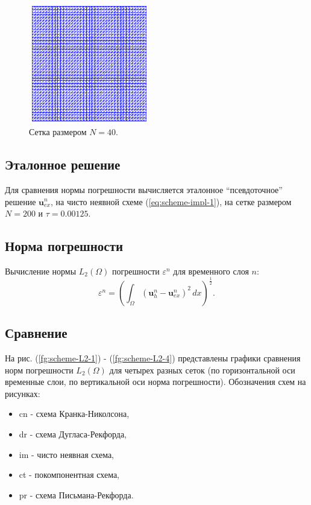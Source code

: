 \documentclass[12pt]{article}
\begin{document}
\begin{figure}
	\begin{center}
		\includegraphics[width=200px]{pics/mesh}
		\caption{Сетка размером $N=40$.}
		\label{fg:scheme-mesh}
	\end{center}
\end{figure}

\subsection{Эталонное решение}
Для сравнения нормы погрешности вычисляется эталонное ``псевдоточное'' решение ${\bm u}_{ex}^n$, на чисто неявной схеме (\ref{eq:scheme-impl-1}), на сетке размером $N=200$ и $\tau=0.00125$.

\subsection{Норма погрешности}
Вычисление нормы $L_2(\Omega)$ погрешности $\varepsilon^n$ для временного слоя $n$:
$$
\varepsilon^n = (\int_{\Omega} ({\bm u}_h^n - {\bm u}_{ex}^n )^2 \, dx)^{\frac{1}{2}}.
$$

\subsection{Сравнение}
На рис. (\ref{fg:scheme-L2-1}) - (\ref{fg:scheme-L2-4}) представлены графики сравнения норм погрешности $L_2(\Omega)$  для четырех разных сеток (по горизонтальной оси временные слои, по вертикальной оси норма погрешности). Обозначения схем на рисунках:
\begin{itemize}
\item cn - схема Кранка-Николсона,
\item dr - схема Дугласа-Рекфорда,
\item im - чисто неявная схема,
\item ct - покомпонентная схема,
\item pr - схема Письмана-Рекфорда.
\end{itemize}
\end{document}

